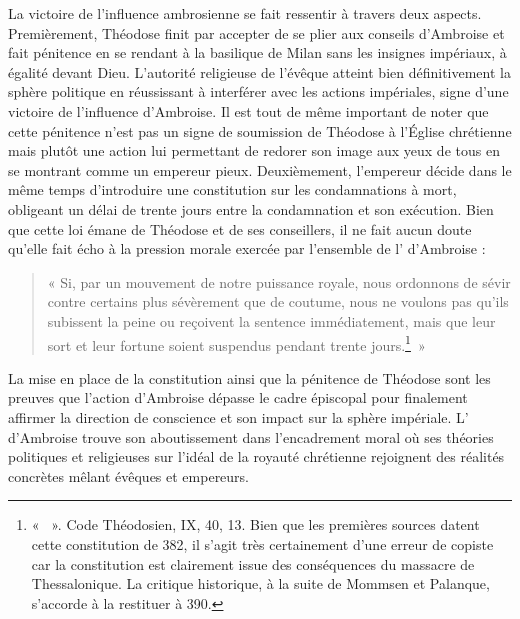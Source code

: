 La victoire de l'influence ambrosienne se fait ressentir à travers deux aspects. Premièrement, Théodose finit par accepter de se plier aux conseils d'Ambroise et fait pénitence en se rendant à la basilique de Milan sans les insignes impériaux, à égalité devant Dieu. L'autorité religieuse de l'évêque atteint bien définitivement la sphère politique en réussissant à interférer avec les actions impériales, signe d'une victoire de l'influence d'Ambroise. Il est tout de même important de noter que cette pénitence n'est pas un signe de soumission de Théodose à l'Église chrétienne mais plutôt une action lui permettant de redorer son image aux yeux de tous en se montrant comme un empereur pieux. Deuxièmement, l'empereur décide dans le même temps d'introduire une constitution sur les condamnations à mort, obligeant un délai de trente jours entre la condamnation et son exécution. Bien que cette loi émane de Théodose et de ses conseillers, il ne fait aucun doute qu'elle fait écho à la pression morale exercée par l'ensemble de l' d'Ambroise :

\bigskip

\begin{quote}
    « Si, par un mouvement de notre puissance royale, nous ordonnons de sévir contre certains plus sévèrement que de coutume, nous ne voulons pas qu'ils subissent la peine ou reçoivent la sentence immédiatement, mais que leur sort et leur fortune soient suspendus pendant trente jours.\footnote{« ~». Code Théodosien, IX, 40, 13. Bien que les premières sources datent cette constitution de 382, il s'agit très certainement d'une erreur de copiste car la constitution est clairement issue des conséquences du massacre de Thessalonique. La critique historique, à la suite de Mommsen et Palanque, s'accorde à la restituer à 390.}~»
\end{quote}

\bigskip

La mise en place de la constitution ainsi que la pénitence de Théodose sont les preuves que l'action d'Ambroise dépasse le cadre épiscopal pour finalement affirmer la direction de conscience et son impact sur la sphère impériale. L' d'Ambroise trouve son aboutissement dans l'encadrement moral où ses théories politiques et religieuses sur l'idéal de la royauté chrétienne rejoignent des réalités concrètes mêlant évêques et empereurs.


